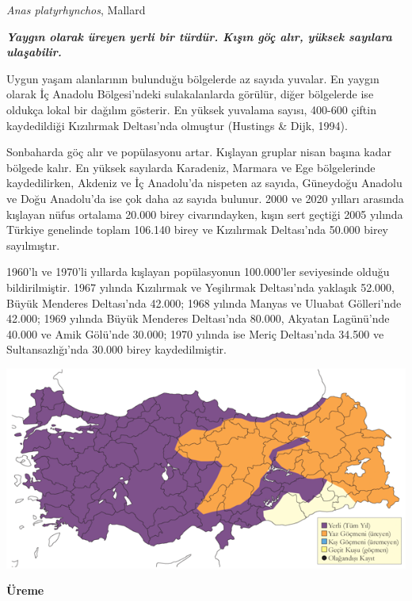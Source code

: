 \documentclass[
  a4paper,
  DIV=11,
  numbers=noendperiod]{scrreprt}
\begin{document}
\emph{Anas platyrhynchos}, Mallard

\textbf{\emph{Yaygın olarak üreyen yerli bir türdür. Kışın göç alır,
yüksek sayılara ulaşabilir.}}

Uygun yaşam alanlarının bulunduğu bölgelerde az sayıda yuvalar. En
yaygın olarak İç Anadolu Bölgesi'ndeki sulakalanlarda görülür, diğer
bölgelerde ise oldukça lokal bir dağılım gösterir. En yüksek yuvalama
sayısı, 400-600 çiftin kaydedildiği Kızılırmak Deltası'nda olmuştur
(Hustings \& Dijk, 1994).

Sonbaharda göç alır ve popülasyonu artar. Kışlayan gruplar nisan başına
kadar bölgede kalır. En yüksek sayılarda Karadeniz, Marmara ve Ege
bölgelerinde kaydedilirken, Akdeniz ve İç Anadolu'da nispeten az sayıda,
Güneydoğu Anadolu ve Doğu Anadolu'da ise çok daha az sayıda bulunur.
2000 ve 2020 yılları arasında kışlayan nüfus ortalama 20.000 birey
civarındayken, kışın sert geçtiği 2005 yılında Türkiye genelinde toplam
106.140 birey ve Kızılırmak Deltası'nda 50.000 birey sayılmıştır.

1960'lı ve 1970'li yıllarda kışlayan popülasyonun 100.000'ler
seviyesinde olduğu bildirilmiştir. 1967 yılında Kızılırmak ve Yeşilırmak
Deltası'nda yaklaşık 52.000, Büyük Menderes Deltası'nda 42.000; 1968
yılında Manyas ve Uluabat Gölleri'nde 42.000; 1969 yılında Büyük
Menderes Deltası'nda 80.000, Akyatan Lagünü'nde 40.000 ve Amik Gölü'nde
30.000; 1970 yılında ise Meriç Deltası'nda 34.500 ve Sultansazlığı'nda
30.000 birey kaydedilmiştir.

\includegraphics{images/harita_Page_016.png}

\textbf{Üreme}
\end{document}
